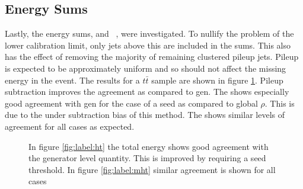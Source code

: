 \subsection{Energy Sums}
Lastly, the energy sums, \scalht and 
\mht~, were investigated. To nullify the problem of the lower calibration limit, only jets above 
this are included in the sums. This also has the effect of removing the majority 
of remaining clustered pileup jets. Pileup is expected to be approximately uniform and so should 
not affect the missing energy in the event. The results for a $t\bar{t}$ sample are 
shown in figure \ref{fig:label:sums}. Pileup subtraction improves the agreement as compared to gen.  The \scalht 
shows especially good agreement with gen for the case of a seed as compared to 
global $\rho$. This is due to the under subtraction bias of this method. The \mht 
shows similar levels of agreement for all cases as expected. 
\begin{figure}
\hfill
{}
\hfill
{}

\caption{In figure \ref{fig:label:ht} the total energy shows good agreement with the generator level quantity. This 
is improved by requiring a seed threshold. In figure \ref{fig:label:mht} similar agreement is shown for 
all cases}
\label{fig:label:sums}
\end{figure}
